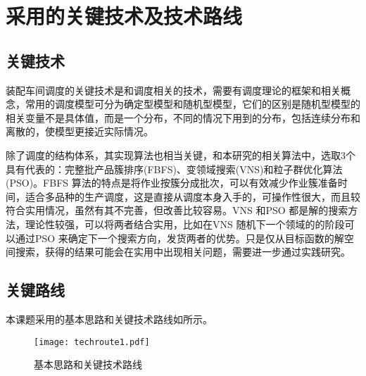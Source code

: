 \chapter{采用的关键技术及技术路线}
\section{关键技术}
装配车间调度的关键技术是和调度相关的技术，需要有调度理论的框架和相关概念，常用的调度模型可分为确定型模型和随机型模型，它们的区别是随机型模型的相关变量不是具体值，而是一个分布，不同的情况下用到的分布，包括连续分布和离散的，使模型更接近实际情况。

除了调度的结构体系，其实现算法也相当关键，和本研究的相关算法中，选取3个具有代表的：完整批产品簇排序(FBFS)、变领域搜索(VNS)和粒子群优化算法(PSO)。FBFS 算法的特点是将作业按簇分成批次，可以有效减少作业簇准备时间，适合多品种的生产调度，这是直接从调度本身入手的，可操作性很大，而且较符合实用情况，虽然有其不完善，但改善比较容易。VNS 和PSO 都是解的搜索方法，理论性较强，可以将两者结合实用，比如在VNS 随机下一个领域的的阶段可以通过PSO 来确定下一个搜索方向，发货两者的优势。只是仅从目标函数的解空间搜索，获得的结果可能会在实用中出现相关问题，需要进一步通过实践研究。
\section{关键路线}
本课题采用的基本思路和关键技术路线如所示。
\begin{figure}[h]
\centering
\texttt{[image: techroute1.pdf]}
\caption{基本思路和关键技术路线\label{fig:1}}
\end{figure}